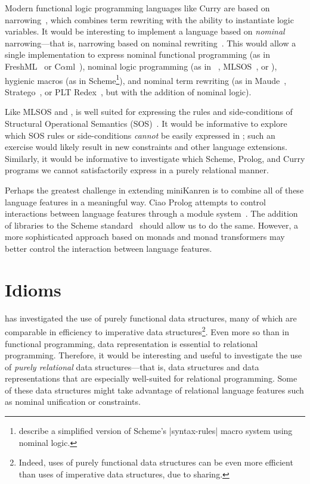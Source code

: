 Modern functional logic programming languages like Curry are based on
narrowing~\cite{AntoyHanusMasseySteiner01PPDP}, which combines term
rewriting with the ability to instantiate logic variables. It would be
interesting to implement a language based on \emph{nominal}
narrowing---that is, narrowing based on nominal
rewriting~\cite{nominalrewriting}. This would allow a single
implementation to express nominal functional programming (as in
FreshML~\cite{ShinwellPG03} or C$\alpha$ml~\cite{pottier06}), nominal
logic programming (as in \alphaprolog~\cite{CheneyU04},
MLSOS~\cite{lakin2007}, or \alphakanren), hygienic macros (as in
Scheme\footnote{\citet{HermanWand08:Hygiene} describe a simplified
  version of Scheme's \scheme|syntax-rules| macro system using nominal
  logic.}), and nominal term rewriting (as in Maude~\cite{Maude2:03},
Stratego~\cite{stratego}, or PLT
Redex~\cite{DBLP:conf/rta/MatthewsFFF04}, but with the addition of
nominal logic).

Like MLSOS and \alphaprolog, \alphakanrensp is well suited for
expressing the rules and side-conditions of Structural Operational
Semantics (SOS)~\cite{Plotkin:2004:SAO}.  It would be informative to
explore which SOS rules or side-conditions \emph{cannot} be easily
expressed in \alphakanren; such an exercise would likely result in new
constraints and other language extensions.  Similarly, it would be
informative to investigate which Scheme, Prolog, and Curry programs we
cannot satisfactorily express in a purely relational manner.

Perhaps the greatest challenge in extending miniKanren is to combine
all of these language features in a meaningful way. Ciao Prolog
attempts to control interactions between language features through a
module system~\cite{DBLP:journals/tcs/GrasH99}. The addition of
libraries to the \RsixRSsp Scheme standard~\cite{r6rs} should allow us
to do the same. However, a more sophisticated approach based on monads
and monad transformers may better control the interaction between
language features.



\section{Idioms}\label{futureidioms}

\citet{Okasaki:1999} has investigated the use of purely functional
data structures, many of which are comparable in efficiency to
imperative data structures\footnote{Indeed, uses of purely functional
  data structures can be even more efficient than uses of imperative
  data structures, due to sharing.}.  Even more so than in functional
programming, data representation is essential to relational
programming.  Therefore, it would be interesting and useful to
investigate the use of \emph{purely relational} data structures---that
is, data structures and data representations that are especially
well-suited for relational programming.  Some of these data structures
might take advantage of relational language features such as nominal
unification or constraints.

